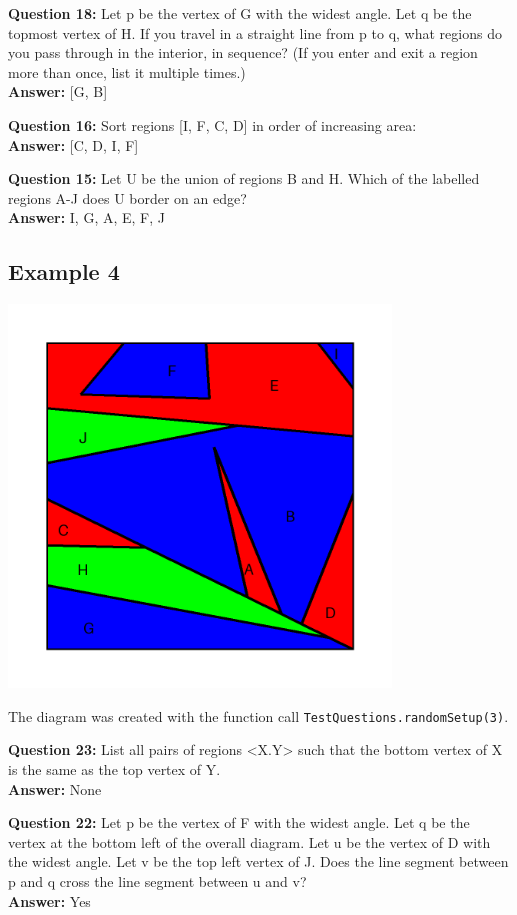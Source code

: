 \documentclass{article}    %
\begin{document}
{\bf Question  18:} Let p be the vertex of G with the widest angle. Let q be the topmost vertex of H. If you travel in a straight line from p to q, what regions do you pass through in the interior, in sequence? (If you enter and exit a region more than once, list it multiple times.) \\
{\bf Answer:}  [G, B]

{\bf Question  16:} Sort regions [I, F, C, D] in order of increasing area: \\
{\bf Answer:}  [C, D, I, F]

{\bf Question  15:} Let U be the union of regions B and H. Which of the labelled regions A-J does U border on an edge? \\
{\bf Answer:}  {I, G, A, E, F, J}

\pagebreak

\subsection{Example 4}
\begin{center}
\includegraphics[height=4in]{Maps/RandomSetup3.png}
\end{center}

{\small  The diagram was created with the function 
call {\tt TestQuestions.randomSetup(3)}.}


{\bf Question  23:} List all pairs of regions <X.Y> such that the bottom vertex of X is the same as the top vertex of Y. \\
{\bf Answer:}  None

{\bf Question  22:} Let p be the vertex of F with the widest angle. Let q be the vertex at the bottom left of the overall diagram. Let u be the vertex of D with the widest angle. Let v be the top left vertex of J. Does the line segment between p and q cross the line segment between u and v? \\
{\bf Answer:}  Yes
\end{document}
